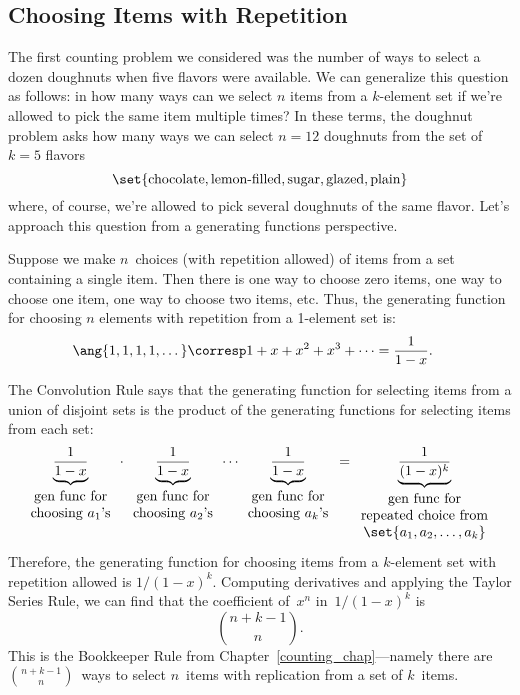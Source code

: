 \subsection{Choosing Items with Repetition}
\label{sec:rep}

The first counting problem we considered was the number of ways to
select a dozen doughnuts when five flavors were available.  We can
generalize this question as follows: in how many ways can we select
$n$ items from a $k$-element set if we're allowed to pick the same
item multiple times?  In these terms, the doughnut problem asks how
many ways we can select $n=12$ doughnuts from the set of $k=5$ flavors
\[
\set{\text{chocolate}, \text{lemon-filled}, \text{sugar}, \text{glazed}, \text{plain}}
\]
%
where, of course, we're allowed to pick several doughnuts of the same
flavor.   Let's approach this question from a generating functions
perspective.

Suppose we make $n$~choices (with repetition allowed) of items from a set
containing a single item.  Then there is one way to choose zero items, one
way to choose one item, one way to choose two items, etc.  Thus, the
generating function for choosing $n$ elements with repetition from a
1-element set is:
%
\begin{align*}
\ang{1, 1, 1, 1, \dots}
     & \corresp  1 + x + x^2 + x^3 + \cdots %
 =  \frac{1}{1-x}.
\end{align*}

The Convolution Rule says that the generating function for selecting
items from a union of disjoint sets is the product of the generating
functions for selecting items from each set:
%
\[
\underbrace{\frac{1}{1-x}}_{
\begin{array}{cc}
\mbox{gen func for} \\
\text{choosing $a_1$'s}
\end{array}}
\cdot
\underbrace{\frac{1}{1-x}}_{
\begin{array}{cc}
\mbox{gen func for} \\
\text{choosing $a_2$'s}
\end{array}}
\cdots
\underbrace{\frac{1}{1-x}}_{
\begin{array}{cc}
\mbox{gen func for} \\
\text{choosing $a_k$'s}
\end{array}}
=
\underbrace{\frac{1}{(1-x)^k}}_{
\begin{array}{cc}
\mbox{gen func for} \\
\text{repeated choice from} \\
\set{a_1, a_2, \dots, a_k}
\end{array}}
\]
%
Therefore, the generating function for choosing items from a
$k$-element set with repetition allowed is $1 / (1 - x)^k$.  Computing
derivatives and applying the Taylor Series Rule, we can find that the
coefficient of~$x^n$ in~$1 / (1 - x)^k$ is
\[
    \binom{n+k-1}{n}.
\]
This is the Bookkeeper Rule from Chapter~\ref{counting_chap}---namely
there are $\binom{n + k - 1}{n}$~ways to select $n$~items with
replication from a set of $k$~items.


